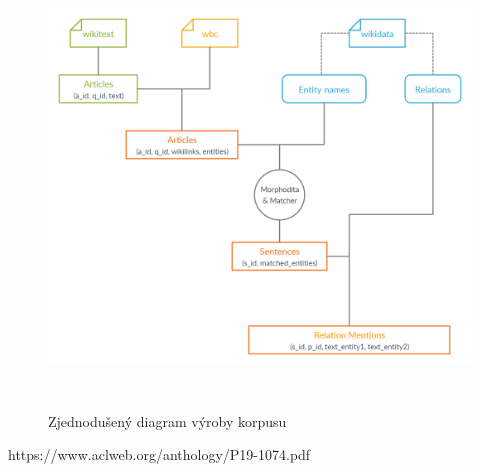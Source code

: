 \begin{figure}[p]\centering
\includegraphics[width=140mm, height=117mm]{./img/Corpus_diagram}
\caption{Zjednodušený diagram výroby korpusu}
\label{obr03:Nhust}
\end{figure}


https://www.aclweb.org/anthology/P19-1074.pdf
